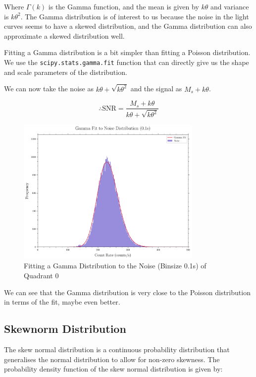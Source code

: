 \documentclass[11pt]{book} %
\begin{document}
    Where $\Gamma(k)$ is the Gamma function, and the mean is given by $k\theta$ and variance is $k\theta^2$. The Gamma distribution is of interest to us because the noise in the light curves seems to have a skewed distribution, and the Gamma distribution can also approximate a skewed distribution well.

Fitting a Gamma distribution is a bit simpler than fitting a Poisson distribution. We use the \lstinline[language=Python]{scipy.stats.gamma.fit} function that can directly give us the shape and scale parameters of the distribution.

We can now take the noise as $k\theta + \sqrt{k\theta^2}$ and the signal as $M_s+k\theta$.

\begin{equation}
    \therefore \text{SNR} = \frac{M_s+k\theta}{k\theta + \sqrt{k\theta^2}}
\end{equation}

\begin{figure}[H]
    \centering
    \includegraphics[width=0.8\textwidth]{Pictures/gamma_fit.png}
    \caption{Fitting a Gamma Distribution to the Noise (Binsize 0.1s) of Quadrant 0}
\end{figure}

We can see that the Gamma distribution is very close to the Poisson distribution in terms of the fit, maybe even better. 

\subsection{Skewnorm Distribution}

The skew normal distribution is a continuous probability distribution that generalises the normal distribution to allow for non-zero skewness. The probability density function of the skew normal distribution is given by:
\end{document}
